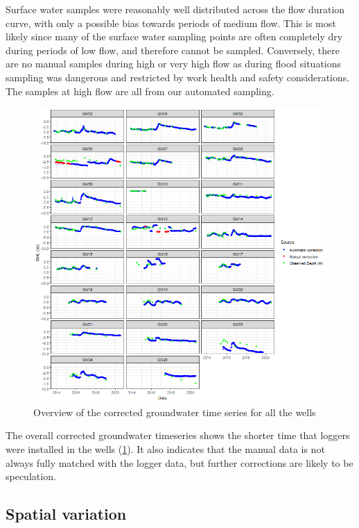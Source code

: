 \documentclass[, manuscript]{copernicus}
\begin{document}
Surface water samples were reasonably well distributed across the flow
duration curve, with only a possible bias towards periods of medium
flow. This is most likely since many of the surface water sampling
points are often completely dry during periods of low flow, and
therefore cannot be sampled. Conversely, there are no manual samples
during high or very high flow as during flood situations sampling was
dangerous and restricted by work health and safety considerations. The
samples at high flow are all from our automated sampling.

\clearpage
\begin{figure}
\includegraphics[width=1\linewidth]{Figures/Final_Corrected_piezodepths} \caption{Overview of the corrected groundwater time series for all the wells}\label{fig:gw-series}
\end{figure}

The overall corrected groundwater timeseries shows the shorter time that
loggers were installed in the wells (\ref{fig:gw-series}). It also
indicates that the manual data is not always fully matched with the
logger data, but further corrections are likely to be speculation.

\subsection{Spatial variation}
\end{document}
